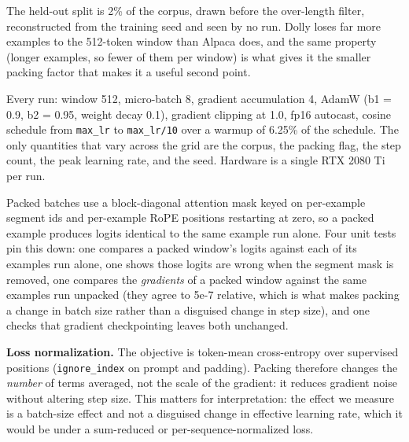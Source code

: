 \documentclass[11pt]{article}
\begin{document}
The held-out split is 2\% of the corpus, drawn before the over-length filter, reconstructed from the training seed and seen by no run. Dolly loses far more examples to the 512-token window than Alpaca does, and the same property (longer examples, so fewer of them per window) is what gives it the smaller packing factor that makes it a useful second point.

Every run: window 512, micro-batch 8, gradient accumulation 4, AdamW (b1 = 0.9, b2 = 0.95, weight decay 0.1), gradient clipping at 1.0, fp16 autocast, cosine schedule from \texttt{max\_\allowbreak{}lr} to \texttt{max\_\allowbreak{}lr/\allowbreak{}10} over a warmup of 6.25\% of the schedule. The only quantities that vary across the grid are the corpus, the packing flag, the step count, the peak learning rate, and the seed. Hardware is a single RTX 2080 Ti per run.

Packed batches use a block-diagonal attention mask keyed on per-example segment ids and per-example RoPE positions restarting at zero, so a packed example produces logits identical to the same example run alone. Four unit tests pin this down: one compares a packed window's logits against each of its examples run alone, one shows those logits are wrong when the segment mask is removed, one compares the \emph{gradients} of a packed window against the same examples run unpacked (they agree to 5e-7 relative, which is what makes packing a change in batch size rather than a disguised change in step size), and one checks that gradient checkpointing leaves both unchanged.

\textbf{Loss normalization.} The objective is token-mean cross-entropy over supervised positions (\texttt{ignore\_\allowbreak{}index} on prompt and padding). Packing therefore changes the \emph{number} of terms averaged, not the scale of the gradient: it reduces gradient noise without altering step size. This matters for interpretation: the effect we measure is a batch-size effect and not a disguised change in effective learning rate, which it would be under a sum-reduced or per-sequence-normalized loss.
\end{document}
